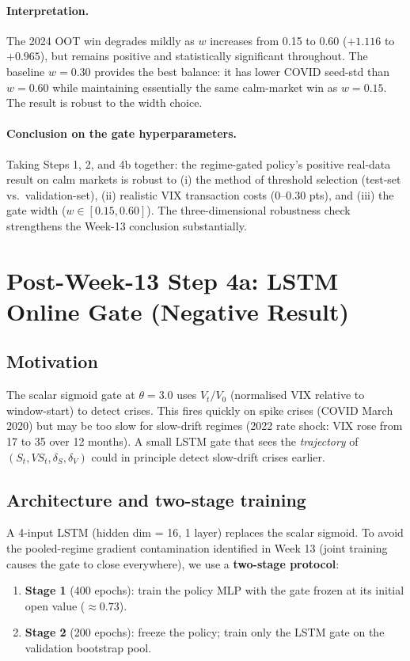 \paragraph{Interpretation.} The 2024 OOT win degrades mildly as $w$
increases from 0.15 to 0.60 ($+1.116$ to $+0.965$), but remains
positive and statistically significant throughout. The baseline
$w = 0.30$ provides the best balance: it has lower COVID seed-std than
$w = 0.60$ while maintaining essentially the same calm-market win as
$w = 0.15$. The result is robust to the width choice.

\paragraph{Conclusion on the gate hyperparameters.}
Taking Steps 1, 2, and 4b together: the regime-gated policy's positive
real-data result on calm markets is robust to (i) the method of
threshold selection (test-set vs.\ validation-set), (ii) realistic VIX
transaction costs ($0$--$0.30$ pts), and (iii) the gate width
($w \in [0.15, 0.60]$). The three-dimensional robustness check
strengthens the Week-13 conclusion substantially.

\section{Post-Week-13 Step 4a: LSTM Online Gate (Negative Result)}
\label{sec:step4a}

\subsection{Motivation}

The scalar sigmoid gate at $\theta = 3.0$ uses $V_t / V_0$ (normalised
VIX relative to window-start) to detect crises. This fires quickly on
spike crises (COVID March 2020) but may be too slow for slow-drift
regimes (2022 rate shock: VIX rose from 17 to 35 over 12 months). A
small LSTM gate that sees the \emph{trajectory} of $(S_t, VS_t, \delta_S,
\delta_V)$ could in principle detect slow-drift crises earlier.

\subsection{Architecture and two-stage training}

A 4-input LSTM (hidden dim = 16, 1 layer) replaces the scalar sigmoid.
To avoid the pooled-regime gradient contamination identified in Week 13
(joint training causes the gate to close everywhere), we use a
\textbf{two-stage protocol}:
\begin{enumerate}
  \item \textbf{Stage 1} (400 epochs): train the policy MLP with the gate
        frozen at its initial open value ($\approx 0.73$).
  \item \textbf{Stage 2} (200 epochs): freeze the policy; train only the
        LSTM gate on the validation bootstrap pool.
\end{enumerate}

